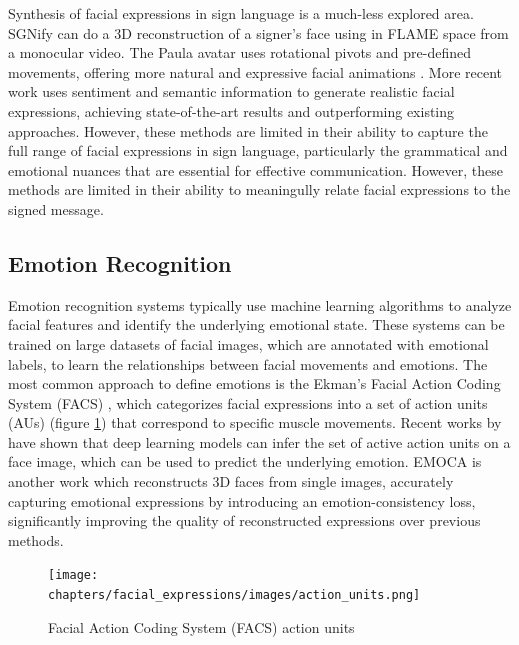 \documentclass[../../main.tex]{subfiles}
\begin{document}
Synthesis of facial expressions in sign language is a much-less explored area. SGNify \cite{Forte_2023_CVPR} can do a 3D reconstruction of a signer's face using in FLAME \cite{todo_flame} space from a monocular video. The Paula avatar uses rotational pivots and pre-defined movements, offering more natural and expressive facial animations \cite{johnson-2022-improved}. More recent work \cite{azevedo2024empowering} uses sentiment and semantic information to generate realistic facial expressions, achieving state-of-the-art results and outperforming existing approaches. However, these methods are limited in their ability to capture the full range of facial expressions in sign language, particularly the grammatical and emotional nuances that are essential for effective communication. However, these methods are limited in their ability to meaningully relate facial expressions to the signed message.

\subsection{Emotion Recognition}
\label{ch:facial_expressions:related_work:emotion_recognition}

Emotion recognition systems typically use machine learning algorithms to analyze facial features and identify the underlying emotional state. These systems can be trained on large datasets of facial images, which are annotated with emotional labels, to learn the relationships between facial movements and emotions. The most common approach to define emotions is the Ekman's Facial Action Coding System (FACS) \cite{ekman1978facial}, which categorizes facial expressions into a set of action units (AUs) (figure \ref{fig:action_units})  that correspond to specific muscle movements. Recent works by \cite{luo2022learning} have shown that deep learning models can infer the set of active action units on a face image, which can be used to predict the underlying emotion. EMOCA \cite{danvevcek2022emoca} is another work which reconstructs 3D faces from single images, accurately capturing emotional expressions by introducing an emotion-consistency loss, significantly improving the quality of reconstructed expressions over previous methods.

\begin{figure}
    \centering
    \texttt{[image: chapters/facial\_expressions/images/action\_units.png]}
    \caption{Facial Action Coding System (FACS) action units}
    \label{fig:action_units}
\end{figure}
\end{document}
